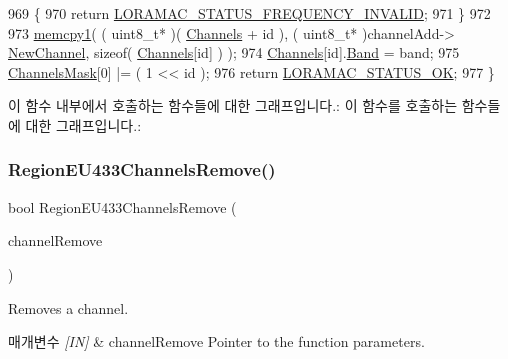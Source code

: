 \begin{DoxyCode}
969     \{
970         \textcolor{keywordflow}{return} \mbox{\hyperlink{group___l_o_r_a_m_a_c_gga1d18f26b344040b3ec5c3db662919661ae3ea7b89796aed5a320013d9743b2955}{LORAMAC\_STATUS\_FREQUENCY\_INVALID}};
971     \}
972 
973     \mbox{\hyperlink{utilities_8c_abfbe672c7136122f16c9214bc4ba8d21}{memcpy1}}( ( uint8\_t* )( \mbox{\hyperlink{_region_e_u433_8c_a989ac3355f1ed5b534b3940af3deeb14}{Channels}} + \textcolor{keywordtype}{id} ), ( uint8\_t* )channelAdd->
      \mbox{\hyperlink{structs_channel_add_params_afc31493a105479490228fd896b20b45c}{NewChannel}}, \textcolor{keyword}{sizeof}( \mbox{\hyperlink{_region_e_u433_8c_a989ac3355f1ed5b534b3940af3deeb14}{Channels}}[\textcolor{keywordtype}{id}] ) );
974     \mbox{\hyperlink{_region_e_u433_8c_a989ac3355f1ed5b534b3940af3deeb14}{Channels}}[id].\mbox{\hyperlink{structs_channel_params_a724c03aa06953111c3291243831f251b}{Band}} = band;
975     \mbox{\hyperlink{_region_e_u433_8c_a2188957b5ca6af8092154d7ccbfa5757}{ChannelsMask}}[0] |= ( 1 << id );
976     \textcolor{keywordflow}{return} \mbox{\hyperlink{group___l_o_r_a_m_a_c_gga1d18f26b344040b3ec5c3db662919661a03db5fca052313edb3823c014b653a74}{LORAMAC\_STATUS\_OK}};
977 \}
\end{DoxyCode}
이 함수 내부에서 호출하는 함수들에 대한 그래프입니다.\+:
이 함수를 호출하는 함수들에 대한 그래프입니다.\+:
\mbox{\label{group___r_e_g_i_o_n_e_u433_ga8c6f83d1c3aadcbc717551c3d4bc912e}} 
\subsubsection{\texorpdfstring{Region\+E\+U433\+Channels\+Remove()}{RegionEU433ChannelsRemove()}}
{\footnotesize\ttfamily bool Region\+E\+U433\+Channels\+Remove (\begin{DoxyParamCaption}\item[{\mbox{\hyperlink{group___r_e_g_i_o_n_gaa37468560d2fc81a977b57a48e5d72c0}{Channel\+Remove\+Params\+\_\+t}} $\ast$}]{channel\+Remove }\end{DoxyParamCaption})}



Removes a channel. 


\begin{DoxyParams}{매개변수}
{\em \mbox{[}\+I\+N\mbox{]}} & channel\+Remove Pointer to the function parameters.\\
\hline
\end{DoxyParams}

